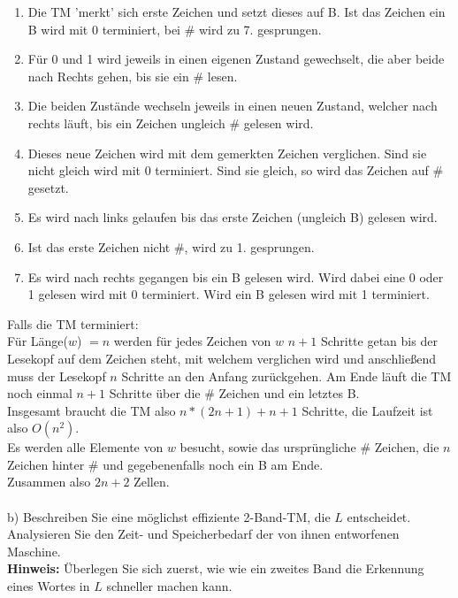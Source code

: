 \begin{enumerate}
\item Die TM 'merkt' sich erste Zeichen und setzt dieses auf B. Ist das Zeichen ein B wird mit 0 terminiert, bei $\#$ wird zu 7. gesprungen.
\item Für 0 und 1 wird jeweils in einen eigenen Zustand gewechselt, die aber beide nach Rechts gehen, bis sie ein $\#$ lesen.
\item Die beiden Zustände wechseln jeweils in einen neuen Zustand, welcher nach rechts läuft, bis ein Zeichen ungleich $\#$ gelesen wird.
\item Dieses neue Zeichen wird mit dem gemerkten Zeichen verglichen. Sind sie nicht gleich wird mit 0 terminiert. Sind sie gleich, so wird das Zeichen auf $\#$ gesetzt.
\item Es wird nach links gelaufen bis das erste Zeichen (ungleich B) gelesen wird.
\item Ist das erste Zeichen nicht $\#$, wird zu 1. gesprungen.
\item Es wird nach rechts gegangen bis ein B gelesen wird. Wird dabei eine 0 oder 1 gelesen wird mit 0 terminiert. Wird ein B gelesen wird mit 1 terminiert.
\end{enumerate}
Falls die TM terminiert:\\
Für Länge($w$) $= n$ werden für jedes Zeichen von $w$ $n+1$ Schritte getan bis der Lesekopf auf dem Zeichen steht, mit welchem verglichen wird und anschließend muss der Lesekopf $n$ Schritte an den Anfang zurückgehen. Am Ende läuft die TM noch einmal $n+1$ Schritte über die $\#$ Zeichen und ein letztes B.\\
Insgesamt braucht die TM also $n*(2n+1)+n+1$ Schritte, die Laufzeit ist also $O(n^2)$.\\
Es werden alle Elemente von $w$ besucht, sowie das ursprüngliche $\#$ Zeichen, die $n$ Zeichen hinter $\#$ und gegebenenfalls noch ein B am Ende.\\
Zusammen also $2n+2$ Zellen.\\\\

b) Beschreiben Sie eine möglichst effiziente 2-Band-TM, die $L$ entscheidet. Analysieren Sie den Zeit- und Speicherbedarf der von ihnen entworfenen Maschine.\\
\textbf{Hinweis:} Überlegen Sie sich zuerst, wie wie ein zweites Band die Erkennung eines Wortes in $L$ schneller machen kann.


